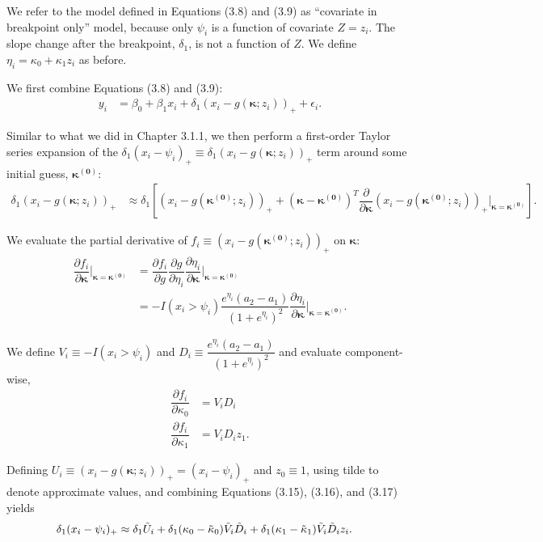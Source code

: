 \documentclass [12pt, proquest] {uwthesis}[2016/11/22]
\begin{document}
We refer to the model defined in Equations (3.8) and (3.9) as ``covariate in breakpoint only'' model, because only $\psi_i$ is a function of covariate $Z = z_i$. The slope change after the breakpoint, $\delta_1$, is not a function of $Z$. We define $\eta_i = \kappa_0 + \kappa_1 z_i$ as before.

We first combine Equations (3.8) and (3.9): 
\begin{align}
    y_i &= \beta_0 + \beta_1 x_i + \delta_1 (x_i - g(\bm{\kappa}; z_i))_+ + \epsilon_i.
\end{align}

Similar to what we did in Chapter 3.1.1, we then perform a first-order Taylor series expansion of the $\delta_1 (x_i - \psi_i)_+ \equiv \delta_1 (x_i - g(\bm{\kappa}; z_i))_+$ term around some initial guess, $\bm{\kappa^{(0)}}$:
\begin{align}
    \delta_1 (x_i - g(\bm{\kappa}; z_i))_+ &\approx \delta_1 [(x_i - g(\bm{\kappa^{(0)}}; z_i))_+ + (\bm{\kappa} - \bm{\kappa^{(0)}})^T \dfrac{\partial}{\partial \bm{\kappa}} (x_i - g(\bm{\kappa^{(0)}}; z_i))_+ \Bigr|_{\bm{\kappa} = \bm{\kappa^{(0)}}}].
\end{align}

We evaluate the partial derivative of $f_i \equiv (x_i - g(\bm{\kappa^{(0)}}; z_i))_+$ on $\bm{\kappa}$:
\begin{align}
    \dfrac{\partial f_i}{\partial \bm{\kappa}} \Bigr|_{\bm{\kappa} = \bm{\kappa^{(0)}}} &= \dfrac{\partial f_i}{\partial g} \dfrac{\partial g}{\partial \eta_i} \dfrac{\partial \eta_i}{\partial \bm{\kappa}} \Bigr|_{\bm{\kappa} = \bm{\kappa^{(0)}}} \nonumber \\
    &= -I(x_i > \psi_i) \dfrac{e^{\eta_i} (a_2 - a_1)}{(1+e^{\eta_i})^2} \dfrac{\partial \eta_i}{\partial \bm{\kappa}} \Bigr|_{\bm{\kappa} = \bm{\kappa^{(0)}}}. \nonumber
\end{align}

We define $V_i \equiv -I(x_i > \psi_i)$ and $D_i \equiv \dfrac{e^{\eta_i} (a_2 - a_1)}{(1+e^{\eta_i})^2}$ and evaluate component-wise,
\begin{align}
    \dfrac{\partial f_i}{\partial \kappa_0} &= V_i D_i \\
    \dfrac{\partial f_i}{\partial \kappa_1} &= V_i D_i z_1.
\end{align}

Defining $U_i \equiv (x_i - g(\bm{\kappa}; z_i))_+ = (x_i - \psi_i)_+$ and $z_0 \equiv 1$, using tilde to denote approximate values, and combining Equations (3.15), (3.16), and (3.17) yields
\begin{align}
    \delta_1 (x_i - \psi_i)_+ &\approx \delta_1 \Tilde{U}_i + \delta_1 (\kappa_0 - \Tilde{\kappa}_0) \Tilde{V}_i \Tilde{D}_i + \delta_1 (\kappa_1 - \Tilde{\kappa}_1) \Tilde{V}_i \Tilde{D}_i z_i.
\end{align}
\end{document}
